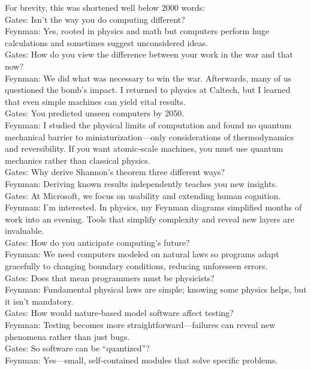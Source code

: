 \documentclass[12pt]{exam}
\newcounter{problem}[section]
\begin{document}
\begin{solution}
For brevity, this was shortened well below 2000 words:\\
Gates: Isn’t the way you do computing different?\\
Feynman: Yes, rooted in physics and math but computers perform huge calculations and sometimes suggest unconsidered ideas.\\
Gates: How do you view the difference between your work in the war and that now?\\
Feynman: We did what was necessary to win the war. Afterwards, many of us questioned the bomb’s impact. I returned to physics at Caltech, but I learned that even simple machines can yield vital results.\\
Gates: You predicted unseen computers by 2050.\\
Feynman: I studied the physical limits of computation and found no quantum mechanical barrier to miniaturization—only considerations of thermodynamics and reversibility. If you want atomic‐scale machines, you must use quantum mechanics rather than classical physics.\\
Gates: Why derive Shannon’s theorem three different ways?\\
Feynman: Deriving known results independently teaches you new insights. \\
Gates: At Microsoft, we focus on usability and extending human cognition.\\
Feynman: I’m interested. In physics, my Feynman diagrams simplified months of work into an evening. Tools that simplify complexity and reveal new layers are invaluable.\\
Gates: How do you anticipate computing’s future?\\
Feynman: We need computers modeled on natural laws so programs adapt gracefully to changing boundary conditions, reducing unforeseen errors.\\
Gates: Does that mean programmers must be physicists?\\
Feynman: Fundamental physical laws are simple; knowing some physics helps, but it isn’t mandatory.\\
Gates: How would nature-based model software affect testing?\\
Feynman: Testing becomes more straightforward—failures can reveal new phenomena rather than just bugs.\\
Gates: So software can be “quantized”?\\
Feynman: Yes—small, self‐contained modules that solve specific problems.\\

\end{solution}
\end{document}
